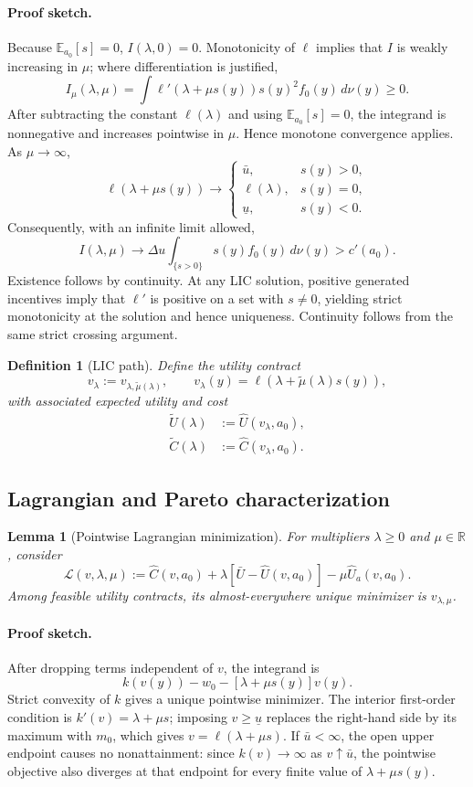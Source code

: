 \documentclass[11pt]{article}
\newtheorem{lemma}{Lemma}
\newtheorem{definition}{Definition}
\theoremstyle{remark}
\newcommand{\R}{\mathbb R}
\newcommand{\E}{\mathbb E}
\newcommand{\dd}{\,d\nu}
\newcommand{\proofsketch}{\paragraph{Proof sketch.}}
\begin{document}
\proofsketch
Because $\E_{a_0}[s]=0$, $I(\lambda,0)=0$.  Monotonicity of $\ell$ implies that
$I$ is weakly increasing in $\mu$; where differentiation is justified,
\[
 I_\mu(\lambda,\mu)=
 \int \ell'(\lambda+\mu s(y))s(y)^2f_0(y)\dd(y)\ge0.
\]
After subtracting the constant $\ell(\lambda)$ and using $\E_{a_0}[s]=0$,
the integrand is nonnegative and increases pointwise in $\mu$.  Hence monotone
convergence applies.  As $\mu\to\infty$,
\[
 \ell(\lambda+\mu s(y))\longrightarrow
 \begin{cases}
  \bar u,&s(y)>0,\\
  \ell(\lambda),&s(y)=0,\\
  \underline u,&s(y)<0.
 \end{cases}
\]
Consequently, with an infinite limit allowed,
\[
 I(\lambda,\mu)\longrightarrow
 \Delta u\int_{\{s>0\}}s(y)f_0(y)\dd(y)>c'(a_0).
\]
Existence follows by continuity.  At any LIC solution, positive generated
incentives imply that $\ell'$ is positive on a set with $s\ne0$, yielding strict
monotonicity at the solution and hence uniqueness.  Continuity follows from the
same strict crossing argument.

\begin{definition}[LIC path]
Define the utility contract
\[
 v_\lambda:=v_{\lambda,\widetilde\mu(\lambda)},
 \qquad
 v_\lambda(y)=\ell(\lambda+\widetilde\mu(\lambda)s(y)),
\]
with associated expected utility and cost
\begin{align*}
 \widetilde U(\lambda)&:=\widehat U(v_\lambda,a_0),\\
 \widetilde C(\lambda)&:=\widehat C(v_\lambda,a_0).
\end{align*}
\end{definition}

\subsection{Lagrangian and Pareto characterization}

\begin{lemma}[Pointwise Lagrangian minimization]
\label{lem:pointwise}
For multipliers $\lambda\ge0$ and $\mu\in\R$, consider
\[
 \mathcal L(v,\lambda,\mu)
 :=\widehat C(v,a_0)+\lambda[\bar U-\widehat U(v,a_0)]
 -\mu\widehat U_a(v,a_0).
\]
Among feasible utility contracts, its almost-everywhere unique minimizer is
$v_{\lambda,\mu}$.
\end{lemma}

\proofsketch
After dropping terms independent of $v$, the integrand is
\[
 k(v(y))-w_0-[\lambda+\mu s(y)]v(y).
\]
Strict convexity of $k$ gives a unique pointwise minimizer.  The interior first-order
condition is $k'(v)=\lambda+\mu s$; imposing $v\ge\underline u$ replaces the
right-hand side by its maximum with $m_0$, which gives $v=\ell(\lambda+\mu s)$.
If $\bar u<\infty$, the open upper endpoint causes no nonattainment: since
$k(v)\to\infty$ as $v\uparrow\bar u$, the pointwise objective also diverges at
that endpoint for every finite value of $\lambda+\mu s(y)$.
\end{document}
